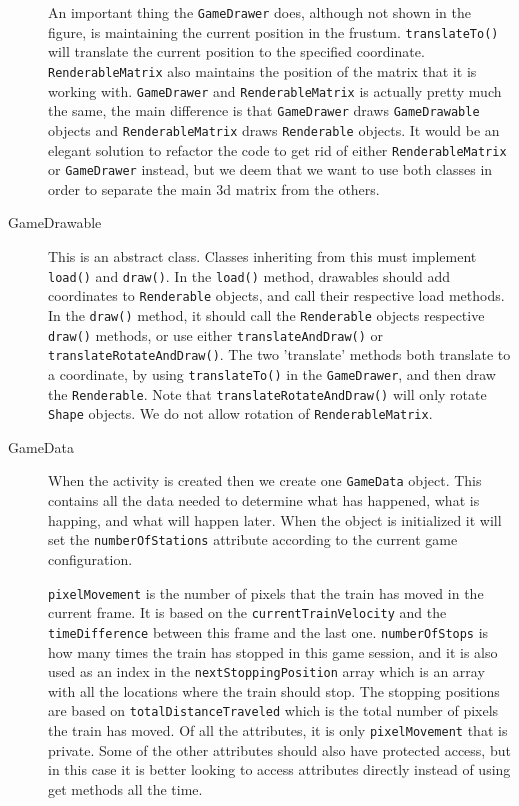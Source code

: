 \begin{description}
An important thing the \lstinline|GameDrawer| does, although not shown in the figure, is maintaining the current position in the frustum. \lstinline|translateTo()| will translate the current position to the specified coordinate. \lstinline|RenderableMatrix| also maintains the position of the matrix that it is working with. \lstinline|GameDrawer| and \linebreak \lstinline|RenderableMatrix| is actually pretty much the same, the main difference is that \lstinline|GameDrawer| draws \lstinline|GameDrawable| objects and \lstinline|RenderableMatrix| draws \lstinline|Renderable| objects. It would be an elegant solution to refactor the code to get rid of either \lstinline|RenderableMatrix| or \lstinline|GameDrawer| instead, but we deem that we want to use both classes in order to separate the main \ac{3d} matrix from the others.

\item[GameDrawable] This is an abstract class. Classes inheriting from this must implement \lstinline|load()| and \lstinline|draw()|. In the \lstinline|load()| method, drawables should add coordinates to \lstinline|Renderable| objects, and call their respective load methods. In the \lstinline|draw()| method, it should call the \lstinline|Renderable| objects respective \lstinline|draw()| methods, or use either \lstinline|translateAndDraw()| or \lstinline|translateRotateAndDraw()|. The two 'translate' methods both translate to a coordinate, by using \lstinline|translateTo()| in the \lstinline|GameDrawer|, and then draw the \lstinline|Renderable|. Note that \lstinline|translateRotateAndDraw()| will only rotate \lstinline|Shape| objects. We do not allow rotation of \lstinline|RenderableMatrix|.

\item[GameData] When the activity is created then we create one \lstinline|GameData| object. This contains all the data needed to determine what has happened, what is happing, and what will happen later. When the object is initialized it will set the \lstinline|numberOfStations| attribute according to the current game configuration.

\lstinline|pixelMovement| is the number of pixels that the train has moved in the current frame. It is based on the \lstinline|currentTrainVelocity| and the \lstinline|timeDifference| between this frame and the last one. \lstinline|numberOfStops| is how many times the train has stopped in this game session, and it is also used as an index in the \lstinline|nextStoppingPosition| array which is an array with all the locations where the train should stop. The stopping positions are based on \lstinline|totalDistanceTraveled| which is the total number of pixels the train has moved. Of all the attributes, it is only \lstinline|pixelMovement| that is private. Some of the other attributes should also have protected access, but in this case it is better looking to access attributes directly instead of using get methods all the time.


\end{description}
